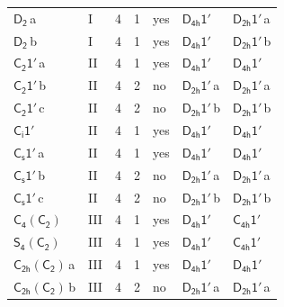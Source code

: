 \documentclass[10pt,a4paper]{article}
\numberwithin{equation}{section}
\newcommand{\grp}[1]{\mathsf{#1}}
\newcommand{\clsletter}[1]{\,{\scriptsize\color{black!55}#1}}
\begin{document}
{\begin{longtable}{@{}llrrlll@{}}
\href{../../../rotation/data/pdf/D2.pdf}{$\grp{D_{2}}$}\clsletter{a} & I & 4 & 1 & yes & \href{D4h-1p.pdf}{$\grp{D_{4h}1'}$} & \href{D2h-1p.pdf}{$\grp{D_{2h}1'}$}\clsletter{a}\\
\href{../../../rotation/data/pdf/D2.pdf}{$\grp{D_{2}}$}\clsletter{b} & I & 4 & 1 & yes & \href{D4h-1p.pdf}{$\grp{D_{4h}1'}$} & \href{D2h-1p.pdf}{$\grp{D_{2h}1'}$}\clsletter{b}\\
\href{C2-1p.pdf}{$\grp{C_{2}1'}$}\clsletter{a} & II & 4 & 1 & yes & \href{D4h-1p.pdf}{$\grp{D_{4h}1'}$} & \href{D4h-1p.pdf}{$\grp{D_{4h}1'}$}\\
\href{C2-1p.pdf}{$\grp{C_{2}1'}$}\clsletter{b} & II & 4 & 2 & no & \href{D2h-1p.pdf}{$\grp{D_{2h}1'}$}\clsletter{a} & \href{D2h-1p.pdf}{$\grp{D_{2h}1'}$}\clsletter{a}\\
\href{C2-1p.pdf}{$\grp{C_{2}1'}$}\clsletter{c} & II & 4 & 2 & no & \href{D2h-1p.pdf}{$\grp{D_{2h}1'}$}\clsletter{b} & \href{D2h-1p.pdf}{$\grp{D_{2h}1'}$}\clsletter{b}\\
\href{S2-1p.pdf}{$\grp{C_{i}1'}$} & II & 4 & 1 & yes & \href{D4h-1p.pdf}{$\grp{D_{4h}1'}$} & \href{D4h-1p.pdf}{$\grp{D_{4h}1'}$}\\
\href{C1v-1p.pdf}{$\grp{C_{s}1'}$}\clsletter{a} & II & 4 & 1 & yes & \href{D4h-1p.pdf}{$\grp{D_{4h}1'}$} & \href{D4h-1p.pdf}{$\grp{D_{4h}1'}$}\\
\href{C1v-1p.pdf}{$\grp{C_{s}1'}$}\clsletter{b} & II & 4 & 2 & no & \href{D2h-1p.pdf}{$\grp{D_{2h}1'}$}\clsletter{a} & \href{D2h-1p.pdf}{$\grp{D_{2h}1'}$}\clsletter{a}\\
\href{C1v-1p.pdf}{$\grp{C_{s}1'}$}\clsletter{c} & II & 4 & 2 & no & \href{D2h-1p.pdf}{$\grp{D_{2h}1'}$}\clsletter{b} & \href{D2h-1p.pdf}{$\grp{D_{2h}1'}$}\clsletter{b}\\
\href{C4-C2.pdf}{$\grp{C_{4}}(\grp{C_{2}})$} & III & 4 & 1 & yes & \href{D4h-1p.pdf}{$\grp{D_{4h}1'}$} & \href{C4h-1p.pdf}{$\grp{C_{4h}1'}$}\\
\href{S4-C2.pdf}{$\grp{S_{4}}(\grp{C_{2}})$} & III & 4 & 1 & yes & \href{D4h-1p.pdf}{$\grp{D_{4h}1'}$} & \href{C4h-1p.pdf}{$\grp{C_{4h}1'}$}\\
\href{C2h-C2.pdf}{$\grp{C_{2h}}(\grp{C_{2}})$}\clsletter{a} & III & 4 & 1 & yes & \href{D4h-1p.pdf}{$\grp{D_{4h}1'}$} & \href{D4h-1p.pdf}{$\grp{D_{4h}1'}$}\\
\href{C2h-C2.pdf}{$\grp{C_{2h}}(\grp{C_{2}})$}\clsletter{b} & III & 4 & 2 & no & \href{D2h-1p.pdf}{$\grp{D_{2h}1'}$}\clsletter{a} & \href{D2h-1p.pdf}{$\grp{D_{2h}1'}$}\clsletter{a}\\

\end{longtable}}
\end{document}
